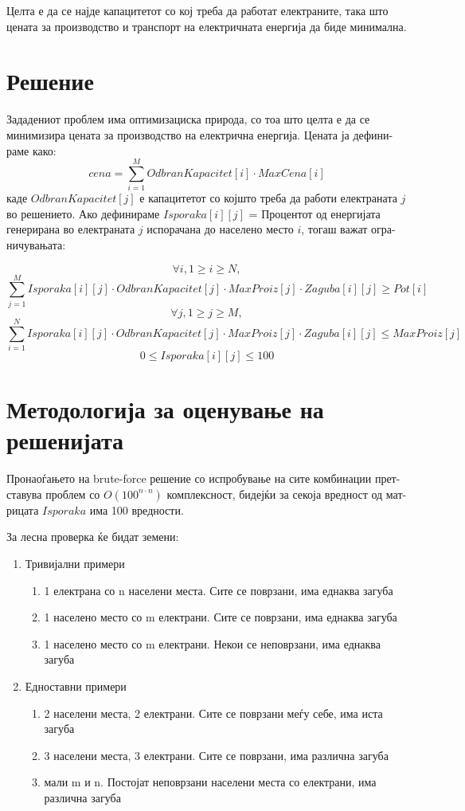 \documentclass{article}
\begin{document}
Целта е да се најде капацитетот со кој треба да работат електраните, така што цената за производство и транспорт на електричната енергија да биде минимална.

\section{Решение}

Зададениот проблем има оптимизациска природа, со тоа што целта е да се минимизира цената за производство на електрична енергија. Цената ја дефини-раме како:
\[cena = \sum_{i=1}^{M}OdbranKapacitet[i]\cdot MaxCena[i]\]
каде $OdbranKapacitet[j]$ е капацитетот со којшто треба да работи електраната $j$ во решението. Ако дефинираме $Isporaka[i][j]$ = Процентот од енергијата генерирана во електраната $j$ испорачана до населено место $i$, тогаш важат огра-ничувањата:

\[\forall i, 1 \geq i \geq N,\]
\[\sum_{j=1}^{M} Isporaka[i][j] \cdot OdbranKapacitet[j] \cdot MaxProiz[j] \cdot Zaguba[i][j] \geq Pot[i]\]
\[\forall j, 1\geq j \geq M,\]
\[\sum_{i=1}^{N} Isporaka[i][j] \cdot OdbranKapacitet[j] \cdot MaxProiz[j] \cdot Zaguba[i][j] \leq MaxProiz[j] \]
\[ 0 \leq Isporaka[i][j] \leq 100 \]

\section{Методологија за оценување на решенијата}
Пронаоѓањето на brute-force решение со испробување на сите комбинации прет-ставува проблем со $O(100^{n \cdot n})$  комплексност, бидејќи за секоја вредност од мат-рицата $Isporaka$ има 100 вредности. 

За лесна проверка ќе бидат земени:
\begin{enumerate}
\item Тривијални примери
	\begin{enumerate}
	\item 1 електрана со n населени места. Сите се поврзани, има еднаква загуба
	\item 1 населено место со m електрани. Сите се поврзани, има еднаква загуба
	\item 1 населено место со m електрани. Некои се неповрзани, има еднаква загуба
	\end{enumerate} 
\item Едноставни примери
	\begin{enumerate}
	\item 2 населени места, 2 електрани. Сите се поврзани меѓу себе, има иста загуба
	\item 3 населени места, 3 електрани. Сите се поврзани, има различна загуба
	\item мали m и n. Постојат неповрзани населени места со електрани, има различна загуба
	\end{enumerate}
\end{enumerate}
\end{document}
